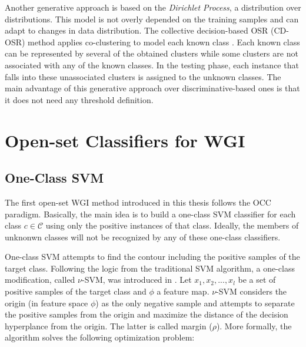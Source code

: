 
Another generative approach is based on the \textit{Dirichlet Process}, a distribution over distributions. This model is not overly depended on the training samples and can adapt to changes in data distribution. The collective decision-based OSR (CD-OSR) method applies co-clustering to model each known class \parencite{geng2018collective}. Each known class can be represented by several of the obtained clusters while some clusters are not associated with any of the known classes. In the testing phase, each instance that falls into these unassociated clusters is assigned to the unknown classes. The main advantage of this generative approach over discriminative-based ones is that it does not need any threshold definition.

\section{Open-set Classifiers for WGI}
\label{chap:openset:sec:Open_set_classifiers_for_WGI}

\subsection{One-Class SVM}\label{chap:openset:sec:OCSVM_description}

The first open-set WGI method introduced in this thesis follows the OCC paradigm. Basically, the main idea is to build a one-class SVM classifier for each class $c \in \mathcal{C}$ using only the positive instances of that class. Ideally, the members of unknonwn classes will not be recognized by any of these one-class classifiers.

One-class SVM attempts to find the contour including the positive samples of the target class. Following the logic from the traditional SVM algorithm, a one-class modification, called $\nu$-SVM, was introduced in \parencite{scholkopf1999estimating}. Let $x_1, x_2,..., x_l$ be a set of positive samples of the target class and $\phi$ a feature map. $\nu$-SVM considers the origin (in feature space $\phi$) as the only negative sample and attempts to separate the positive samples from the origin and maximize the distance of the decision hyperplance from the origin. The latter is called margin ($\rho$). More formally, the algorithm solves the following optimization problem:

